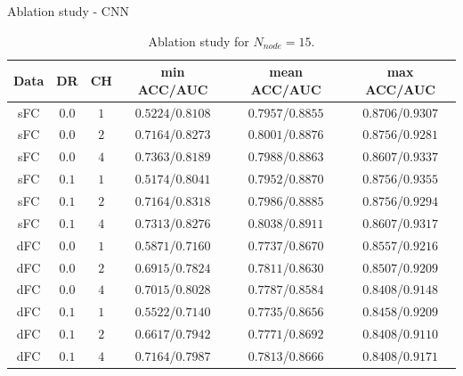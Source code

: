 \documentclass{beamer}
\begin{document}
\begin{frame}{Ablation study - CNN}

    \begin{table}[H]
        \centering
        \begin{tabular}{|c|c|c|c|c|c|}
            \hline
            Data & DR    & CH  & min ACC/AUC       & mean ACC/AUC      & max ACC/AUC       \\
            \hline
            sFC  & $0.0$ & $1$ & $0.5224$/$0.8108$ & $0.7957$/$0.8855$ & $0.8706$/$0.9307$ \\
            \hline
            sFC  & $0.0$ & $2$ & $0.7164$/$0.8273$ & $0.8001$/$0.8876$ & $0.8756$/$0.9281$ \\
            \hline
            sFC  & $0.0$ & $4$ & $0.7363$/$0.8189$ & $0.7988$/$0.8863$ & $0.8607$/$0.9337$ \\
            \hline
            sFC  & $0.1$ & $1$ & $0.5174$/$0.8041$ & $0.7952$/$0.8870$ & $0.8756$/$0.9355$ \\
            \hline
            sFC  & $0.1$ & $2$ & $0.7164$/$0.8318$ & $0.7986$/$0.8885$ & $0.8756$/$0.9294$ \\
            \hline
            sFC  & $0.1$ & $4$ & $0.7313$/$0.8276$ & $0.8038$/$0.8911$ & $0.8607$/$0.9317$ \\
            \hline
            dFC  & $0.0$ & $1$ & $0.5871$/$0.7160$ & $0.7737$/$0.8670$ & $0.8557$/$0.9216$ \\
            \hline
            dFC  & $0.0$ & $2$ & $0.6915$/$0.7824$ & $0.7811$/$0.8630$ & $0.8507$/$0.9209$ \\
            \hline
            dFC  & $0.0$ & $4$ & $0.7015$/$0.8028$ & $0.7787$/$0.8584$ & $0.8408$/$0.9148$ \\
            \hline
            dFC  & $0.1$ & $1$ & $0.5522$/$0.7140$ & $0.7735$/$0.8656$ & $0.8458$/$0.9209$ \\
            \hline
            dFC  & $0.1$ & $2$ & $0.6617$/$0.7942$ & $0.7771$/$0.8692$ & $0.8408$/$0.9110$ \\
            \hline
            dFC  & $0.1$ & $4$ & $0.7164$/$0.7987$ & $0.7813$/$0.8666$ & $0.8408$/$0.9171$ \\
            \hline
        \end{tabular}
        \caption{Ablation study for $N_{node} = 15$.}
    \end{table}

\end{frame}
\end{document}
